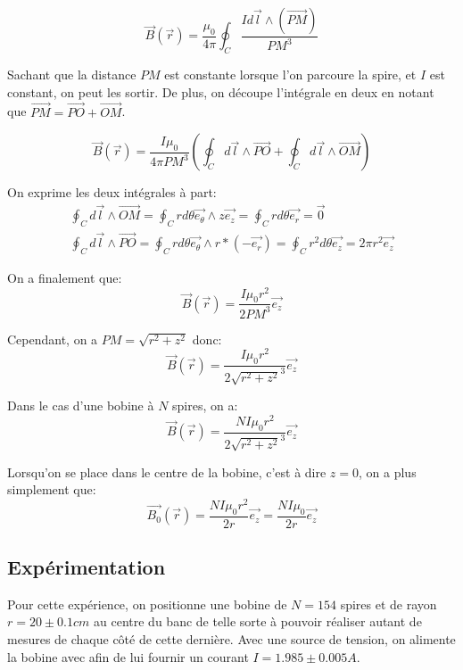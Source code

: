 \documentclass[12pt]{article}
\begin{document}
\begin{equation}
    \vec{B}(\vec{r}) = \frac{\mu_0}{4 \pi} \oint_C \frac{I d\vec{l} \wedge (\vec{PM})}{PM^3}
\end{equation}

Sachant que la distance $PM$ est constante lorsque l'on parcoure la spire, et $I$ est constant, on peut les sortir. De plus,
on découpe l'intégrale en deux en notant que $\vec{PM} = \vec{PO} + \vec{OM}$.

\begin{equation}
    \vec{B}(\vec{r}) = \frac{I \mu_0}{4 \pi PM^3} \left( \oint_C d\vec{l} \wedge \vec{PO} + \oint_C d\vec{l} \wedge \vec{OM} \right)
\end{equation}

On exprime les deux intégrales à part:
\begin{gather*}
    \oint_C d\vec{l} \wedge \vec{OM} = \oint_C rd\theta \vec{e_\theta} \wedge z\vec{e_z} = \oint_C rd\theta \vec{e_r} = \vec{0} \\
    \oint_C d\vec{l} \wedge \vec{PO} = \oint_C rd\theta \vec{e_\theta} \wedge r * (-\vec{e_r}) = \oint_C r^2 d\theta \vec{e_z} = 2 \pi r^2\vec{e_z}
\end{gather*}

On a finalement que:
\begin{equation}
    \vec{B}(\vec{r}) = \frac{I \mu_0 r^2}{2 PM^3} \vec{e_z}
\end{equation}

Cependant, on a $PM = \sqrt{r^2 + z^2}$ donc:
\begin{equation}
    \vec{B}(\vec{r}) = \frac{I \mu_0 r^2}{2 \sqrt{r^2 + z^2}^3} \vec{e_z}
\end{equation}

Dans le cas d'une bobine à $N$ spires, on a:
\begin{equation}
    \label{eqn:champ_magn_z}
    \vec{B}(\vec{r}) = \frac{N I \mu_0 r^2}{2 \sqrt{r^2 + z^2}^3} \vec{e_z}
\end{equation}

Lorsqu'on se place dans le centre de la bobine, c'est à dire $z = 0$, on a plus simplement que:
\begin{equation}
    \label{eqn:champ_magn_0}
    \vec{B_0}(\vec{r}) = \frac{NI \mu_0 r^2}{2r} \vec{e_z} = \frac{NI \mu_0}{2r} \vec{e_z}
\end{equation}

\newpage
\subsection{Expérimentation}
Pour cette expérience, on positionne une bobine de $N = 154$ spires et de rayon $r = 20 \pm 0.1 cm$ au centre du banc de telle sorte à pouvoir réaliser
autant de mesures de chaque côté de cette dernière. Avec une source de tension, on alimente la bobine avec 
afin de lui fournir un courant $I = 1.985 \pm 0.005A$.
\end{document}
